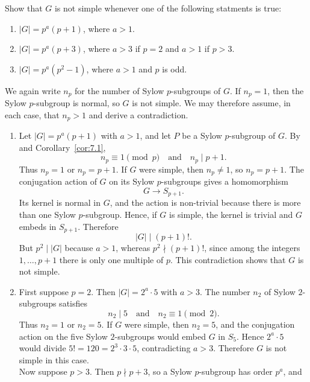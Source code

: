 \documentclass[../Odyssey_Project.tex]{subfiles}
\begin{document}
\begin{exercise}
\label{ex:7.10}
Show that $G$ is not simple whenever one of the following statments is true:
\begin{enumerate}
    \item[(a)] $|G| = p^a(p + 1)$, where $a > 1$.
    \item[(b)] $|G| = p^a(p + 3)$, where $a > 3$ if $p = 2$ and $a > 1$ if $p > 3$.
    \item[(c)] $|G| = p^a(p^2 - 1)$, where $a > 1$ and $p$ is odd.
\end{enumerate}
\end{exercise}
\begin{solution}
    We again write $n_p$ for the number of Sylow $p$-subgroups of $G$. If $n_p=1$, then the Sylow $p$-subgroup is normal, so $G$ is not simple. We may therefore assume, in each case, that $n_p>1$ and derive a contradiction.
    \phantom{}\par
    \begin{enumerate}
        \item[(a)] Let $|G|=p^a(p+1)$ with $a>1$, and let $P$ be a Sylow $p$-subgroup of $G$. By  and Corollary~\ref{cor:7.1},
        \[
            n_p\equiv 1\pmod p
            \quad\text{and}\quad
            n_p\mid p+1.
        \]
        Thus $n_p=1$ or $n_p=p+1$. If $G$ were simple, then $n_p\neq 1$, so $n_p=p+1$. The conjugation action of $G$ on its Sylow $p$-subgroups gives a homomorphism
        \[
            G\to S_{p+1}.
        \]
        Its kernel is normal in $G$, and the action is non-trivial because there is more than one Sylow $p$-subgroup. Hence, if $G$ is simple, the kernel is trivial and $G$ embeds in $S_{p+1}$. Therefore
        \[
            |G|\mid (p+1)!.
        \]
        But $p^2\mid |G|$ because $a>1$, whereas $p^2\nmid (p+1)!$, since among the integers $1,\ldots,p+1$ there is only one multiple of $p$. This contradiction shows that $G$ is not simple.
        \item[(b)] First suppose $p=2$. Then $|G|=2^a\cdot 5$ with $a>3$. The number $n_2$ of Sylow $2$-subgroups satisfies
        \[
            n_2\mid 5
            \quad\text{and}\quad
            n_2\equiv 1\pmod 2.
        \]
        Thus $n_2=1$ or $n_2=5$. If $G$ were simple, then $n_2=5$, and the conjugation action on the five Sylow $2$-subgroups would embed $G$ in $S_5$. Hence $2^a\cdot 5$ would divide $5!=120=2^3\cdot 3\cdot 5$, contradicting $a>3$. Therefore $G$ is not simple in this case.\\
        Now suppose $p>3$. Then $p\nmid p+3$, so a Sylow $p$-subgroup has order $p^a$, and

\end{enumerate}
\end{solution}
\end{document}
